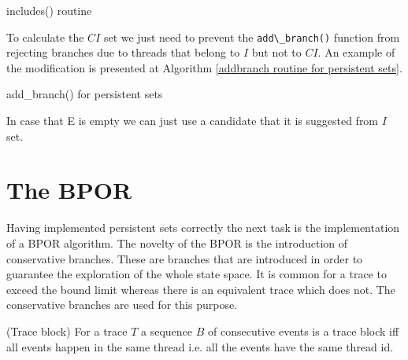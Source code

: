 \begin{algorithm}
    \caption{includes() routine}
    \label{include routine}
\end{algorithm}

To calculate the $CI$ set we just need to prevent the \verb|add\_branch()| function from rejecting branches due to threads that belong to $I$ but not to $CI$.
An example of the modification is presented at Algorithm \ref{addbranch routine for persistent sets}.

\begin{algorithm}
    \caption{add\_branch() for persistent sets}
    \label{addbranch routine for persistent sets}
\end{algorithm}

In case that E is empty we can just use a candidate that it is suggested from $I$ set.

\section{The BPOR}
Having implemented persistent sets correctly the next task is the implementation of a BPOR algorithm. The novelty of the BPOR is the introduction of conservative branches. These
are branches that are introduced in order to guarantee the exploration of the whole state space. It is common for a trace to exceed the bound limit whereas there is
an equivalent trace which does not. The conservative branches are used for this purpose.

\begin{definition}{(Trace block)}
For a trace $T$ a sequence $B$ of consecutive events is a trace block iff all events happen in the same thread i.e. all the events have the same thread id.
\end{definition}

